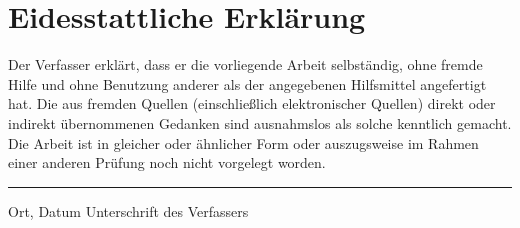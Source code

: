 %
%
\thispagestyle{empty}

\chapter*{Eidesstattliche Erklärung}

Der Verfasser erklärt, dass er die vorliegende Arbeit selbständig, ohne fremde
Hilfe und ohne Benutzung anderer als der angegebenen Hilfsmittel angefertigt
hat. Die aus fremden Quellen (einschließlich elektronischer Quellen) direkt oder
indirekt übernommenen Gedanken sind ausnahmslos als solche kenntlich gemacht.
Die Arbeit ist in gleicher oder ähnlicher Form oder auszugsweise im Rahmen einer
anderen Prüfung noch nicht vorgelegt worden.
\vspace{2.0cm}
%
\hrule
Ort, Datum  \hspace*{.55\textwidth} Unterschrift des Verfassers
%

